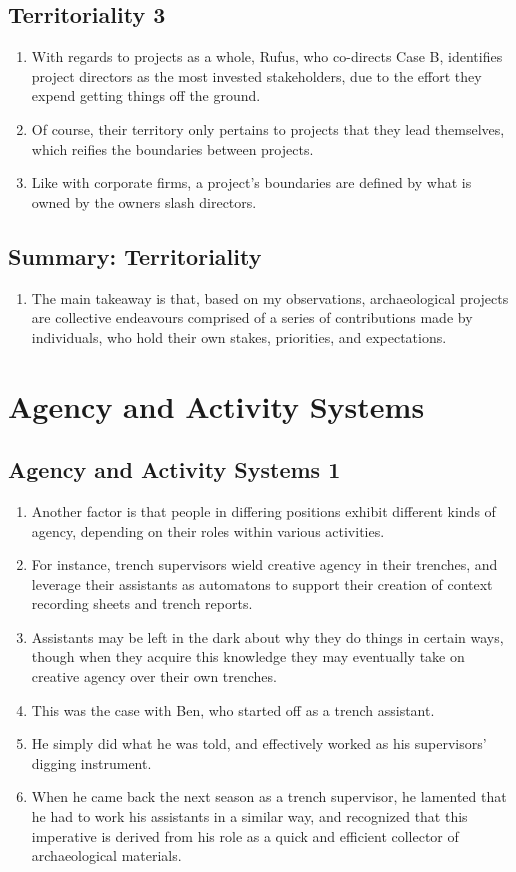 \documentclass{article}
\begin{document}
\subsection{Territoriality 3}
\begin{enumerate}
  \item With regards to projects as a whole, Rufus, who co-directs Case B, identifies project directors as the most invested stakeholders, due to the effort they expend getting things off the ground.
  \item Of course, their territory only pertains to projects that they lead themselves, which reifies the boundaries between projects.
  \item Like with corporate firms, a project's boundaries are defined by what is owned by the owners slash directors.
  
\end{enumerate}
  
\subsection{Summary: Territoriality}
\begin{enumerate}
  \item The main takeaway is that, based on my observations, archaeological projects are collective endeavours comprised of a series of contributions made by individuals, who hold their own stakes, priorities, and expectations.

\end{enumerate}

\section{Agency and Activity Systems}
\subsection{Agency and Activity Systems 1}
\begin{enumerate}
  \item Another factor is that people in differing positions exhibit different kinds of agency, depending on their roles within various activities.
  \item For instance, trench supervisors wield creative agency in their trenches, and leverage their assistants as automatons to support their creation of context recording sheets and trench reports.
  \item Assistants may be left in the dark about why they do things in certain ways, though when they acquire this knowledge they may eventually take on creative agency over their own trenches.
  \item This was the case with Ben, who started off as a trench assistant.
  \item He simply did what he was told, and effectively worked as his supervisors' digging instrument.
  \item When he came back the next season as a trench supervisor, he lamented that he had to work his assistants in a similar way, and recognized that this imperative is derived from his role as a quick and efficient collector of archaeological materials.
\end{enumerate}
\end{document}
